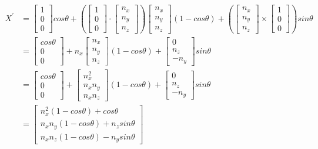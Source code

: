 \begin{equation*}
    \begin{split}
        X^{'} &= \begin{bmatrix} 1 \\ 0 \\ 0 \end{bmatrix} cos\theta + (\begin{bmatrix} 1 \\ 0 \\ 0 \end{bmatrix} \cdot \begin{bmatrix} n_{x} \\ n_{y} \\ n_{z} \end{bmatrix}) \begin{bmatrix} n_{x} \\ n_{y} \\ n_{z} \end{bmatrix} (1 - cos\theta) + (\begin{bmatrix} n_{x} \\ n_{y} \\ n_{z} \end{bmatrix} \times \begin{bmatrix} 1 \\ 0 \\ 0 \end{bmatrix}) sin\theta \\
        &= \begin{bmatrix} cos\theta \\ 0 \\ 0 \end{bmatrix} + n_{x} \begin{bmatrix} n_{x} \\ n_{y} \\ n_{z} \end{bmatrix} (1 - cos\theta) + \begin{bmatrix} 0 \\ n_{z} \\ -n_{y} \end{bmatrix} sin\theta \\
        &= \begin{bmatrix} cos\theta \\ 0 \\ 0 \end{bmatrix} + \begin{bmatrix} n_{x}^{2} \\ n_{x}n_{y} \\ n_{x}n_{z} \end{bmatrix} (1 - cos\theta) + \begin{bmatrix} 0 \\ n_{z} \\ -n_{y} \end{bmatrix} sin\theta \\
        &= \begin{bmatrix} n_{x}^{2}(1 - cos\theta) + cos\theta \\ n_{x}n_{y}(1 - cos\theta) + n_{z}sin\theta \\ n_{x}n_{z}(1 - cos\theta) - n_{y}sin\theta \end{bmatrix} 
    \end{split}
\end{equation*}
